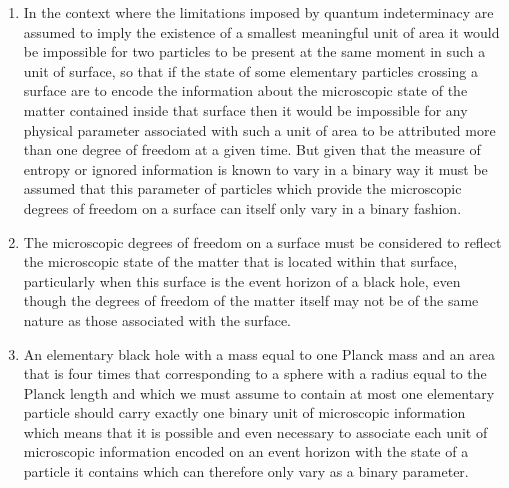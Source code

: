\documentclass[notitlepage,12pt]{report}
\begin{document}
\begin{enumerate}
\item In the context where the limitations imposed by quantum indeterminacy are assumed to imply the existence of a smallest meaningful unit of area it would be impossible for two particles to be present at the same moment in such a unit of surface, so that if the state of some elementary particles crossing a surface are to encode the information about the microscopic state of the matter contained inside that surface then it would be impossible for any physical parameter associated with such a unit of area to be attributed more than one degree of freedom at a given time. But given that the measure of entropy or ignored information is known to vary in a binary way it must be assumed that this parameter of particles which provide the microscopic degrees of freedom on a surface can itself only vary in a binary fashion.

\item The microscopic degrees of freedom on a surface must be considered to reflect the microscopic state of the matter that is located within that surface, particularly when this surface is the event horizon of a black hole, even though the degrees of freedom of the matter itself may not be of the same nature as those associated with the surface.

\item An elementary black hole with a mass equal to one Planck mass and an area that is four times that corresponding to a sphere with a radius equal to the Planck length and which we must assume to contain at most one elementary particle should carry exactly one binary unit of microscopic information which means that it is possible and even necessary to associate each unit of microscopic information encoded on an event horizon with the state of a particle it contains which can therefore only vary as a binary parameter.


\end{enumerate}
\end{document}
